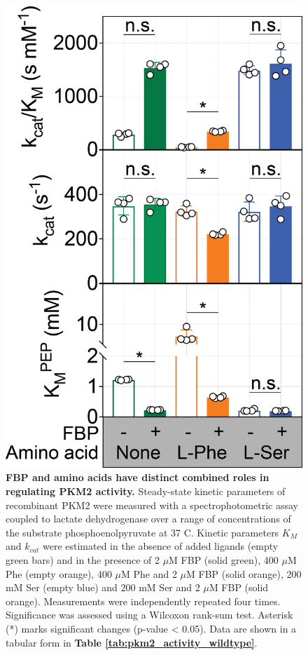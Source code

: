 \begin{figure}[!ht]
\includegraphics[scale=0.4]{ch4_fig5_AA_activity.png}
\caption[FBP and amino acids have distinct combined roles in regulating PKM2 activity.] {\textbf{FBP and amino acids have distinct combined roles in regulating PKM2 activity.} Steady-state kinetic parameters of recombinant PKM2 were measured with a spectrophotometric assay coupled to lactate dehydrogenase over a range of concentrations of the substrate phosphoenolpyruvate at 37 \textdegree C. Kinetic parameters $K_M$ and $k_{cat}$ were estimated in the absence of added ligands (empty green bars) and in the presence of 2 $\mu$M FBP (solid green), 400 $\mu$M Phe (empty orange), 400 $\mu$M  Phe and 2 $\mu$M FBP (solid orange), 200 mM Ser (empty blue) and 200 mM Ser and 2 $\mu$M FBP (solid orange). Measurements were independently repeated four times. Significance was assessed using a Wilcoxon rank-sum test. Asterisk (*) marks significant changes (p-value < 0.05). Data are shown in a tabular form in \textbf{Table \ref{tab:pkm2_activity_wildtype}}.}
\label{fig:AA_activity}
\end{figure}
%
%
\clearpage


